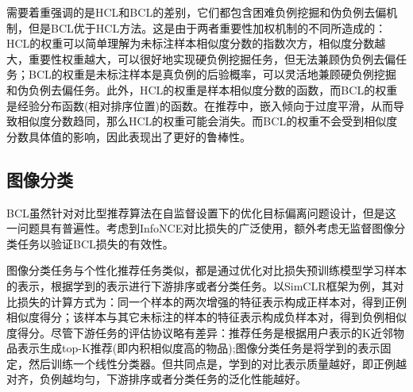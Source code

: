 需要着重强调的是HCL和BCL的差别，它们都包含困难负例挖掘和伪负例去偏机制，但是BCL优于HCL方法。这是由于两者重要性加权机制的不同所造成的：HCL的权重可以简单理解为未标注样本相似度分数的指数次方，相似度分数越大，重要性权重越大，可以很好地实现硬负例挖掘任务，但无法兼顾伪负例去偏任务；BCL的权重是未标注样本是真负例的后验概率，可以灵活地兼顾硬负例挖掘和伪负例去偏任务。此外，HCL的权重是样本相似度分数的函数，而BCL的权重是经验分布函数(相对排序位置)的函数。在推荐中，嵌入倾向于过度平滑，从而导致相似度分数趋同，那么HCL的权重可能会消失。而BCL的权重不会受到相似度分数具体值的影响，因此表现出了更好的鲁棒性。

\subsection{图像分类}
BCL虽然针对对比型推荐算法在自监督设置下的优化目标偏离问题设计，但是这一问题具有普遍性。考虑到InfoNCE对比损失的广泛使用，额外考虑无监督图像分类任务以验证BCL损失的有效性。

图像分类任务与个性化推荐任务类似，都是通过优化对比损失预训练模型学习样本的表示，根据学到的表示进行下游排序或者分类任务。以SimCLR\cite{Chen:2020:ICML}框架为例，其对比损失的计算方式为：同一个样本的两次增强的特征表示构成正样本对，得到正例相似度得分；该样本与其它未标注的样本的特征表示构成负样本对，得到负例相似度得分。尽管下游任务的评估协议略有差异：推荐任务是根据用户表示的K近邻物品表示生成top-K推荐(即内积相似度高的物品);图像分类任务是将学到的表示固定，然后训练一个线性分类器。但共同点是，学到的对比表示质量越好，即正例越对齐，负例越均匀，下游排序或者分类任务的泛化性能越好\cite{Arora:2019:ICML}。
